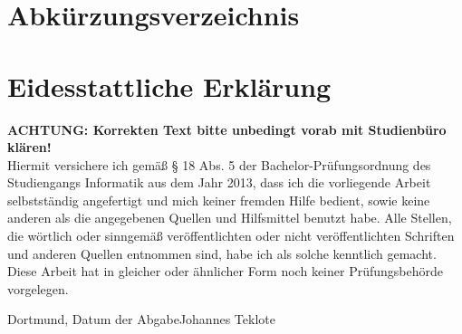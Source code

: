 \documentclass[
	oneside,  %
	ngerman, 
	final, 
	11pt, 
	a4paper, 
	1.1headlines, 
	headinclude=false, 
	footinclude=false, 
	mpinclude=false, 
	pagesize, 
	onecolumn, 
	titlepage, 
	parskip=half, 
	headsepline, 
	chapterprefix=false, 
	version=first, 
	listof=totoc, 
	bibliography=totoc, 
	toc=graduated, 
	fleqn
]{scrbook}
\newcommand*{\fhdopaperdate}{Datum der Abgabe}
\newcommand*{\fhdopaperauthor}{Johannes Teklote}
\begin{document}
\cleardoublepage{}
\chapter*{Abkürzungsverzeichnis}
\begin{acronym}
\end{acronym}

\newpage{}

\cleardoublepage{}
\listoffigures

\newpage{}

\cleardoublepage{}
\listoftables

\lstlistoflistings 
	


	
\chapter*{Eidesstattliche Erklärung}
\thispagestyle{empty}
\textbf{ACHTUNG: Korrekten Text bitte unbedingt vorab mit Studienbüro klären!}\\
Hiermit versichere ich gemäß § 18 Abs. 5 der Bachelor-Prüfungsordnung des Studiengangs Informatik aus dem Jahr 2013, dass ich die  vorliegende Arbeit selbstständig angefertigt und mich keiner fremden Hilfe bedient, sowie keine anderen als die angegebenen Quellen und Hilfsmittel benutzt habe. Alle Stellen, die wörtlich oder sinngemäß veröffentlichten oder nicht veröffentlichten Schriften und anderen Quellen entnommen sind, habe ich als solche kenntlich gemacht. Diese Arbeit hat in gleicher oder ähnlicher Form noch keiner Prüfungsbehörde vorgelegen.

\vspace{1\baselineskip}%
Dortmund, \fhdopaperdate \hfill \fhdopaperauthor
\end{document}
